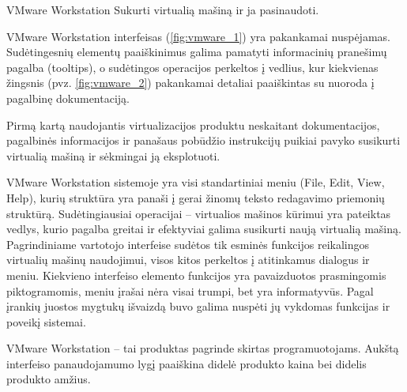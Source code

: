 \begin{xcase}{VMware Workstation}
  \xcgoal
  {
    Sukurti virtualią mašiną ir ja pasinaudoti.
  }
  
  \xctools
  {
    VMware Workstation interfeisas (\ref{fig:vmware_1}) yra pakankamai nuspėjamas. Sudėtingesnių elementų 
    paaiškinimus galima pamatyti informacinių pranešimų pagalba (tooltips), o sudėtingos
    operacijos perkeltos į vedlius, kur kiekvienas žingsnis (pvz. \ref{fig:vmware_2}) pakankamai detaliai 
    paaiškintas su nuoroda į pagalbinę dokumentaciją.
  }
  
  \xcresult
  {
    Pirmą kartą naudojantis virtualizacijos produktu neskaitant dokumentacijos, pagalbinės
    informacijos ir panašaus pobūdžio instrukcijų puikiai pavyko susikurti virtualią mašiną
    ir sėkmingai ją eksplotuoti.
  }
  
  \xcprinciples
  {
    {
      VMware Workstation sistemoje yra visi standartiniai meniu (File, Edit, View, Help), kurių
      struktūra yra panaši į gerai žinomų teksto redagavimo priemonių struktūrą.
    }
    {
      Sudėtingiausiai operacijai – virtualios mašinos kūrimui yra pateiktas vedlys, kurio
      pagalba greitai ir efektyviai galima susikurti naują virtualią mašiną.
    }
    {
      Pagrindiniame vartotojo interfeise sudėtos tik esminės funkcijos reikalingos virtualių
      mašinų naudojimui, visos kitos perkeltos į atitinkamus dialogus ir meniu.
    }
    {
      Kiekvieno interfeiso elemento funkcijos yra pavaizduotos prasmingomis piktogramomis, meniu
      įrašai nėra visai trumpi, bet yra informatyvūs.
    }
    {
      Pagal įrankių juostos mygtukų išvaizdą buvo galima nuspėti jų vykdomas funkcijas ir 
      poveikį sistemai.
    }
  }
  
  \xcthoughts
  {
    VMware Workstation – tai produktas pagrinde skirtas programuotojams. Aukštą interfeiso
    panaudojamumo lygį paaiškina didelė produkto kaina bei didelis produkto amžius.
  }
\end{xcase}
